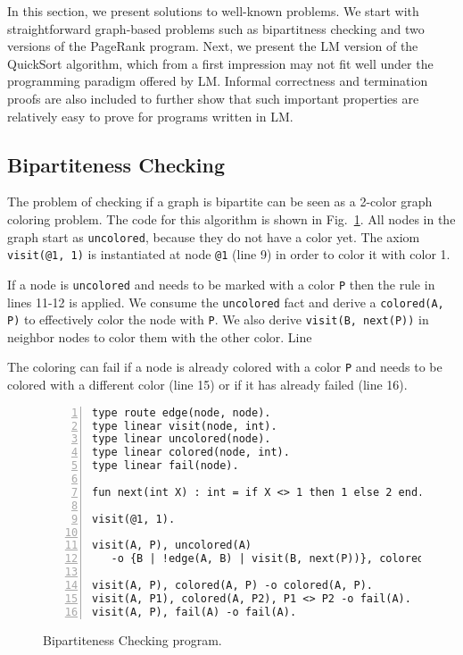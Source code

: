 In this section, we present solutions to well-known problems. We start with
straightforward graph-based problems such as bipartitness checking and two
versions of the PageRank program. Next, we present the LM version of the
QuickSort algorithm, which from a first impression may not fit well under the
programming paradigm offered by LM. Informal correctness and termination proofs
are also included to further show that such important properties are relatively
easy to prove for programs written in LM.

\subsection{Bipartiteness Checking}

The problem of checking if a graph is bipartite can be seen as a 2-color graph
coloring problem.  The code for this algorithm is shown in
Fig.~\ref{language:code:bichecking}. All nodes in the graph start as
\texttt{uncolored},
because they do not have a color yet. The axiom \texttt{visit(@1, 1)} is
instantiated at node \texttt{@1} (line 9) in order to color it with color 1.

If a node is \texttt{uncolored} and needs to be marked with a color \texttt{P}
then the rule in lines 11-12 is applied. We consume the \texttt{uncolored} fact
and derive a \texttt{colored(A, P)} to effectively color the node with
\texttt{P}. We also derive \texttt{visit(B, next(P))} in neighbor nodes to color
them with the other color. Line 

The coloring can fail if a node is already colored with a color \texttt{P} and
needs to be colored with a different color (line 15) or if it has already failed
(line 16).

\begin{figure}[h!]
\begin{Verbatim}[numbers=left,fontsize=\scriptsize]
type route edge(node, node).
type linear visit(node, int).
type linear uncolored(node).
type linear colored(node, int).
type linear fail(node).

fun next(int X) : int = if X <> 1 then 1 else 2 end.

visit(@1, 1).

visit(A, P), uncolored(A)
   -o {B | !edge(A, B) | visit(B, next(P))}, colored(A, P).

visit(A, P), colored(A, P) -o colored(A, P).
visit(A, P1), colored(A, P2), P1 <> P2 -o fail(A).
visit(A, P), fail(A) -o fail(A).
\end{Verbatim}
  \caption{Bipartiteness Checking program.}
  \label{language:code:bichecking}
\end{figure}

